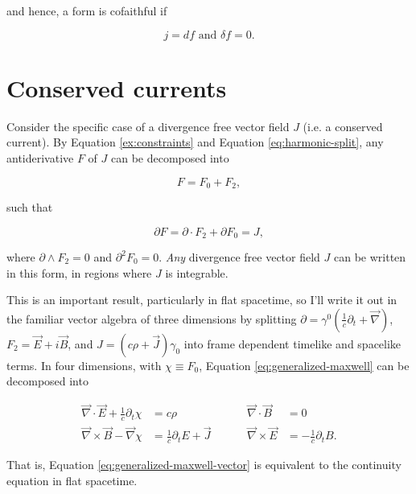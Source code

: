 \documentclass[twocolumn]{article}
\begin{document}
and hence, a form is cofaithful if

\begin{equation}
  j = df \text{ and } \delta f = 0.
\end{equation}

\section{Conserved currents}

Consider the specific case of a divergence free vector field $J$ (i.e. a conserved current). By Equation \ref{ex:constraints} and Equation \ref{eq:harmonic-split}, any antiderivative $F$ of $J$ can be decomposed into 

\begin{equation}
  F = F_0 + F_2,
\end{equation}

such that

\begin{equation}
  \partial F = \partial \cdot F_2 + \partial F_0 = J, \label{eq:generalized-maxwell}
\end{equation}

where $\partial \wedge F_2 = 0$ and $\partial^2 F_0 = 0$. \emph{Any} divergence free vector field $J$ can be written in this form, in regions where $J$ is integrable.

This is an important result, particularly in flat spacetime, so I'll write it out in the familiar vector algebra of three dimensions by splitting $\partial = \gamma^0( \frac{1}{c}\partial_t + \vec \nabla)$, $F_2 = \vec{E} + i \vec{B}$, and $J = (c \rho + \vec J) \gamma_0$ into frame dependent timelike and spacelike terms. In four dimensions, with $\chi \equiv F_0$, Equation \ref{eq:generalized-maxwell} can be decomposed into

\begin{equation}
  \begin{aligned}
    \vec \nabla \cdot \vec E + \frac{1}{c}\partial_t \chi &= c \rho &\hspace{1cm} \vec \nabla \cdot \vec B &= 0 \\
    \vec \nabla \times \vec B - \vec \nabla \chi &= \frac{1}{c} \partial_t E + \vec J &\hspace{1cm} \vec \nabla \times \vec E &= -\frac{1}{c} \partial_t B.\label{eq:generalized-maxwell-vector}
  \end{aligned}
\end{equation}

That is, Equation \ref{eq:generalized-maxwell-vector} is equivalent to the continuity equation in flat spacetime.
\end{document}

